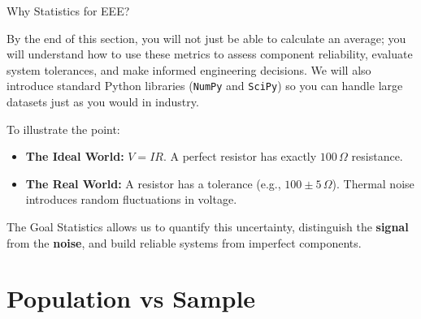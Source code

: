 \begin{frame}{Why Statistics for EEE?}
{By the end of this section, you will not just be able to calculate an average; you will understand how to use these metrics to assess component reliability, evaluate system tolerances, and make informed engineering decisions. We will also introduce standard Python libraries (\texttt{NumPy} and \texttt{SciPy}) so you can handle large datasets just as you would in industry.

To illustrate the point:
}
    \begin{itemize}
        \item \textbf{The Ideal World:} $V = IR$. A perfect resistor has exactly $100\,\Omega$ resistance.
        \item \textbf{The Real World:} A resistor has a tolerance (e.g., $100 \pm 5\,\Omega$). Thermal noise introduces random fluctuations in voltage.
    \end{itemize}
        \begin{block}{The Goal}
        Statistics allows us to quantify this uncertainty, distinguish the \textbf{signal} from the \textbf{noise}, and build reliable systems from imperfect components.
    \end{block}
\end{frame}

\section{Population vs Sample}


